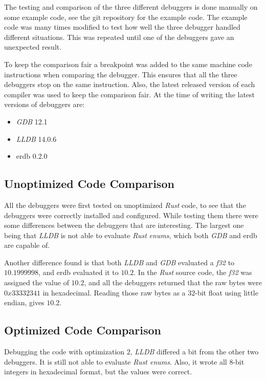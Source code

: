 The testing and comparison of the three different debuggers is done manually on some example code, see the git repository \cite{example-code} for the example code.
The example code was many times modified to test how well the three debugger handled different situations.
This was repeated until one of the debuggers gave an unexpected result.


To keep the comparison fair a breakpoint was added to the same machine code instructions when comparing the debugger.
This ensures that all the three debuggers stop on the same instruction.
Also, the latest released version of each compiler was used to keep the comparison fair.
At the time of writing the latest versions of debuggers are:

\begin{itemize}
    \item \emph{GDB} 12.1
    \item \emph{LLDB} 14.0.6
    \item \gls{erdb} 0.2.0 %
\end{itemize}




\subsection{Unoptimized Code Comparison}
All the debuggers were first tested on unoptimized \emph{Rust} code, to see that the debuggers were correctly installed and configured.
While testing them there were some differences between the debuggers that are interesting.
The largest one being that \emph{LLDB} is not able to evaluate \emph{Rust} \emph{enums}, which both \emph{GDB} and \gls{erdb} are capable of.


Another difference found is that both \emph{LLDB} and \emph{GDB} evaluated a \emph{f32} to $10.1999998$, and \gls{erdb} evaluated it to $10.2$.
In the \emph{Rust} source code, the \emph{f32} was assigned the value of $10.2$, and all the debuggers returned that the raw bytes were $0x33332341$ in hexadecimal.
Reading those raw bytes as a $32$-bit float using little endian, gives $10.2$.



\subsection{Optimized Code Comparison} %
Debugging the code with optimization $2$, \emph{LLDB} differed a bit from the other two debuggers.
It is still not able to evaluate \emph{Rust enums}.
Also, it wrote all $8$-bit integers in hexadecimal format, but the values were correct.


